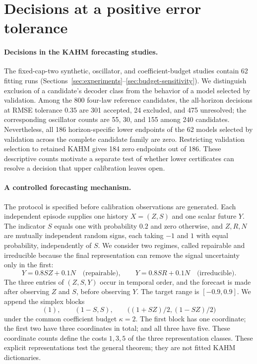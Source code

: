 \section{Decisions at a positive error tolerance}
\label{sec:decision-value}

\paragraph{Decisions in the KAHM forecasting studies.}
The fixed-cap-two synthetic, oscillator, and coefficient-budget studies contain 62
fitting runs (Sections~\ref{sec:experiments}--\ref{sec:budget-sensitivity}).
We distinguish exclusion of a candidate's decoder class from the behavior
of a model selected by validation. Among the 800 four-law reference candidates, the all-horizon decisions at
RMSE tolerance $0.35$ are 301 accepted, 24 excluded, and 475 unresolved;
the corresponding oscillator counts are 55, 30, and 155 among 240 candidates.
Nevertheless, all 186 horizon-specific lower endpoints of the 62 models
selected by validation across the complete candidate family are zero.
Restricting validation selection to retained KAHM gives 184 zero endpoints
out of 186. These descriptive counts motivate a separate test of whether
lower certificates can resolve a decision that upper calibration leaves open.

\paragraph{A controlled forecasting mechanism.}
The protocol is specified before calibration observations are generated.
Each independent episode supplies one history $X=(Z,S)$ and one scalar future
$Y$. The indicator $S$ equals one with probability $0.2$ and zero otherwise,
and $Z,R,N$ are mutually independent random signs, each taking $-1$ and $1$
with equal probability, independently of $S$. We consider two regimes, called
repairable and irreducible because the final
representation can remove the signal uncertainty only in the first:
\[
  Y=0.8SZ+0.1N \quad\text{(repairable)},\qquad
  Y=0.8SR+0.1N \quad\text{(irreducible)}.
\]
The three entries of $(Z,S,Y)$ occur in temporal order, and the forecast is
made after observing $Z$ and $S$, before observing $Y$. The target range is
$[-0.9,0.9]$. We append the simplex
blocks
\[
 (1),\qquad (1-S,S),\qquad
 \bigl((1+SZ)/2,(1-SZ)/2\bigr)
\]
under the common coefficient budget $\kappa=2$. The first block has one
coordinate; the first two have three coordinates in
total; and all three have five. These coordinate counts define the costs
$1,3,5$ of the three representation classes. These explicit representations
test the general theorem; they are not fitted KAHM dictionaries.

